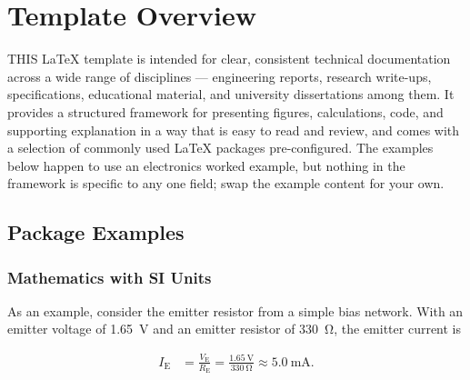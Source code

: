 %

\section{Template Overview}
\label{sec:templateOverview}

\lettrine[lines=2, slope=0em, loversize=0.14, nindent=0pt, lhang=0.3, lraise=0]{T}{HIS} \LaTeX{} template is intended for clear, consistent technical documentation
across a wide range of disciplines — engineering reports, research write-ups,
specifications, educational material, and university dissertations among them.
It provides a structured framework for presenting figures, calculations, code,
and supporting explanation in a way that is easy to read and review, and comes
with a selection of commonly used \LaTeX{} packages pre-configured. The
examples below happen to use an electronics worked example, but nothing in the
framework is specific to any one field; swap the example content for your own.

\subsection{Package Examples}

\subsubsection{Mathematics with SI Units}

As an example, consider the emitter resistor from a simple bias network. With
an emitter voltage of \qty{1.65}{\volt} and an emitter resistor of
\qty{330}{\ohm}, the emitter current is

\begin{align}
  \label{eq:biasCurrent}
  I_{\text{E}}
    &= \frac{V_{\text{E}}}{R_{\text{E}}}
     = \frac{\qty{1.65}{\volt}}{\qty{330}{\ohm}}
     \approx \qty{5.0}{\milli\ampere}.
\end{align}

